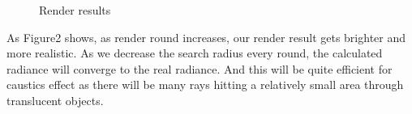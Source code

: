 \documentclass[acmtog]{acmart}
\begin{document}
\begin{figure}[H]
				\caption{Render results}
	\end{figure}
	As Figure2 shows, as render round increases, our render result gets brighter and more realistic. 
	As we decrease the search radius every round, the calculated radiance will converge to the real radiance. 
	And this will be quite efficient for caustics effect as there will be many rays hitting a relatively small area through translucent objects.
\end{document}
